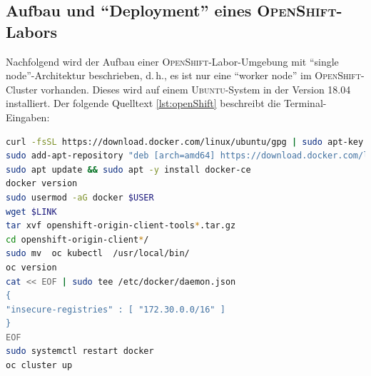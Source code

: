 \subsection{Aufbau und \enquote{Deployment} eines \textsc{OpenShift}-Labors}
Nachfolgend wird der Aufbau einer \textsc{OpenShift}-Labor-Umgebung mit \enquote{single node}-Architektur beschrieben, d.\,h., es ist nur eine \enquote{worker node} im \textsc{OpenShift}-Cluster vorhanden. Dieses wird auf einem \textsc{Ubuntu}-System in der Version 18.04 installiert. Der folgende Quelltext \vref{lst:openShift} beschreibt die Terminal-Eingaben:

\begin{lstlisting}[language=bash, caption={Installation des \textsc{OpenShift}-Clusters}, label=lst:openShift]
curl -fsSL https://download.docker.com/linux/ubuntu/gpg | sudo apt-key add -
sudo add-apt-repository "deb [arch=amd64] https://download.docker.com/linux/ubuntu $(lsb_release -cs) stable"
sudo apt update && sudo apt -y install docker-ce
docker version
sudo usermod -aG docker $USER
wget $LINK
tar xvf openshift-origin-client-tools*.tar.gz
cd openshift-origin-client*/
sudo mv  oc kubectl  /usr/local/bin/
oc version 
cat << EOF | sudo tee /etc/docker/daemon.json 
{
"insecure-registries" : [ "172.30.0.0/16" ]
}
EOF
sudo systemctl restart docker
oc cluster up
\end{lstlisting}

